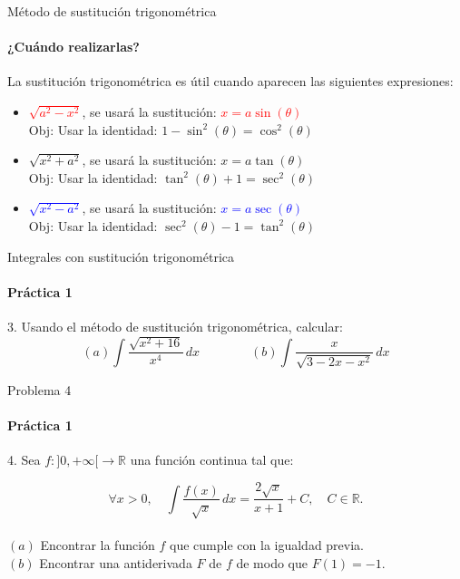 \documentclass{plantillaPPT}
\begin{document}
\begin{frame}{Método de sustitución trigonométrica}
\framesubtitle{¿Cuándo realizarlas?}

    La sustitución trigonométrica es útil cuando aparecen las siguientes expresiones:

    \begin{itemize}
        \item \textcolor{red}{\(\sqrt{a^2-x^2}\)}, se usará la %
        sustitución: \textcolor{red}{\(x=a\sin(\theta)\)} \\
        Obj: Usar la identidad: \(1-\sin^2(\theta)=\cos^2(\theta)\)
        \vspace{0.25cm}
        \item \textcolor{green!50!black}{\(\sqrt{x^2+a^2}\)}, se usará la sustitución: \textcolor{green!40!black}{\(x=a\tan(\theta)\)} \\
        Obj: Usar la identidad: \(\tan^2(\theta)+1=\sec^2(\theta)\)
        \vspace{0.25cm}
        \item  \textcolor{blue}{\(\sqrt{x^2-a^2}\)}, se usará la sustitución: \textcolor{blue}{\(x=a\sec(\theta)\)} \\
        Obj: Usar la identidad: \(\sec^2(\theta)-1=\tan^2(\theta)\)
    \end{itemize}
\end{frame}

\begin{frame}{Integrales con sustitución trigonométrica}
\framesubtitle{Práctica 1}

3. Usando el método de sustitución trigonométrica, calcular: \\[5pt]
\[
(a) \int \frac{\sqrt{x^2+16}}{x^4}\,dx \qquad \qquad (b)\int \frac{x}{\sqrt{3-2x-x^2}}\,dx
\]
    
\end{frame}


\begin{frame}{Problema 4}
\framesubtitle{Práctica 1}

4. Sea \(f:]0, +\infty[ \to \mathbb{R}\) una función continua tal que:

\[
\forall x>0, \quad \int \frac{f(x)}{\sqrt{x}}\,dx = \frac{2\sqrt{x}}{x+1} + C, \quad C\in\mathbb{R}.
\] \\[5pt]

\((a)\) Encontrar la función \(f\) que cumple con la igualdad previa.\\
\((b)\) Encontrar una antiderivada \(F\) de \(f\) de modo que \(F(1)=-1\).

\end{frame}
\end{document}

